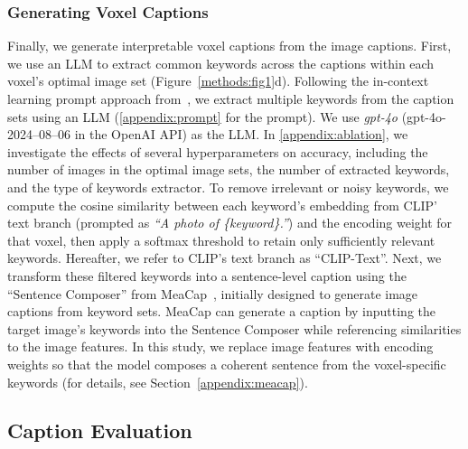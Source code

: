 \subsubsection{Generating Voxel Captions}
Finally, we generate interpretable voxel captions from the image captions. First, we use an LLM to extract common keywords across the captions within each voxel’s optimal image set (Figure~\ref{methods:fig1}d). Following the in-context learning prompt approach from~\cite{dunlap2024describing}, we extract multiple keywords from the caption sets using an LLM (\ref{appendix:prompt} for the prompt). We use \textit{gpt-4o} (gpt-4o-2024–08–06 in the OpenAI API) as the LLM. In \ref{appendix:ablation}, we investigate the effects of several hyperparameters on accuracy, including the number of images in the optimal image sets, the number of extracted keywords, and the type of keywords extractor.
To remove irrelevant or noisy keywords, we compute the cosine similarity between each keyword’s embedding from CLIP' text branch (prompted as \textit{``A photo of \{keyword\}.''}) and the encoding weight for that voxel, then apply a softmax threshold to retain only sufficiently relevant keywords. Hereafter, we refer to CLIP's text branch as ``CLIP-Text''.
Next, we transform these filtered keywords into a sentence-level caption using the ``Sentence Composer'' from MeaCap~\cite{zeng2024meacap}, initially designed to generate image captions from keyword sets. 
MeaCap can generate a caption by inputting the target image’s keywords into the Sentence Composer while referencing similarities to the image features.
In this study, we replace image features with encoding weights so that the model composes a coherent sentence from the voxel-specific keywords (for details, see Section~\ref{appendix:meacap}).



\subsection{Caption Evaluation}

